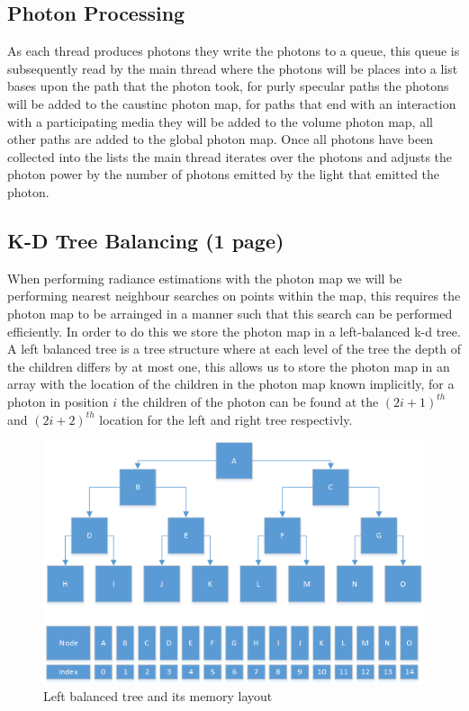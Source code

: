\subsection{Photon Processing}
As each thread produces photons they write the photons to a queue, this queue is subsequently read by the main thread where
the photons will be places into a list bases upon the path that the photon took, for purly specular paths the photons
will be added to the caustinc photon map, for paths that end with an interaction with a participating media they will be
added to the volume photon map, all other paths are added to the global photon map. Once all photons have been collected
into the lists the main thread iterates over the photons and adjusts the photon power by the number of photons emitted by
the light that emitted the photon. 

\subsection{K-D Tree Balancing (1 page)}
When performing radiance estimations with the photon map we will be performing nearest neighbour searches on points within
the map, this requires the photon map to be arrainged in a manner such that this search can be performed efficiently.
In order to do this we store the photon map in a left-balanced k-d tree. A left balanced tree is a tree structure where
at each level of the tree the depth of the children differs by at most one, 
this allows us to store the photon map in an array with the location of the children in the photon map known implicitly,
for a photon in position $i$ the children of the photon can be found at the $(2i + 1)^{th}$ and $(2i + 2)^{th}$
location for the left and right tree respectivly.


\begin{figure}
\centering
\includegraphics[scale=0.75]{./images/left-balanced-tree.png}
\caption{Left balanced tree and its memory layout}
\end{figure}

